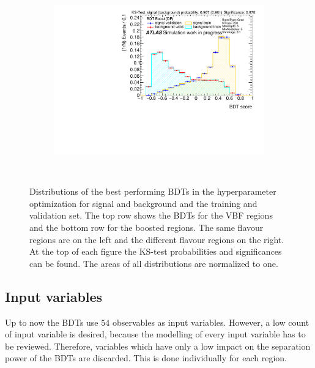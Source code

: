 \begin{figure}[htbp]
\begin{subfigure}[t]{0.49\textwidth}
    \end{subfigure}
    \begin{subfigure}[t]{0.49\textwidth}
        \includegraphics[width=\textwidth]{./plots/mva/scan/BOOST_DF_bdt_output.pdf}
    \end{subfigure}
    \caption{Distributions of the best performing BDTs in the hyperparameter optimization for signal and background and the training and validation set.
             The top row shows the BDTs for the VBF regions and the bottom row for the boosted regions.
             The same flavour regions are on the left and the different flavour regions on the right.
             At the top of each figure the KS-test probabilities and significances can be found.
             The areas of all distributions are normalized to one.}~\label{fig:mva:scan:bdts}
\end{figure}

\FloatBarrier{}

\subsection{Input variables}\label{sub:mva:input_variables}

Up to now the BDTs use $54$ observables as input variables.
However, a low count of input variable is desired, because the modelling of every input variable has to be reviewed.
Therefore, variables which have only a low impact on the separation power of the BDTs are discarded.
This is done individually for each region.

